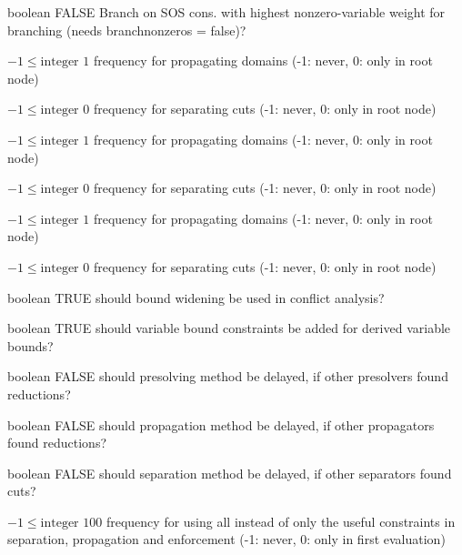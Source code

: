 %
{boolean}%
{FALSE}%
{Branch on SOS cons. with highest nonzero-variable weight for branching (needs branchnonzeros = false)?}%
{}

%
{$-1\leq\textrm{integer}$}%
{$1$}%
{frequency for propagating domains (-1: never, 0: only in root node)}%
{}

%
{$-1\leq\textrm{integer}$}%
{$0$}%
{frequency for separating cuts (-1: never, 0: only in root node)}%
{}

%
{$-1\leq\textrm{integer}$}%
{$1$}%
{frequency for propagating domains (-1: never, 0: only in root node)}%
{}

%
{$-1\leq\textrm{integer}$}%
{$0$}%
{frequency for separating cuts (-1: never, 0: only in root node)}%
{}

%
{$-1\leq\textrm{integer}$}%
{$1$}%
{frequency for propagating domains (-1: never, 0: only in root node)}%
{}

%
{$-1\leq\textrm{integer}$}%
{$0$}%
{frequency for separating cuts (-1: never, 0: only in root node)}%
{}

%
{boolean}%
{TRUE}%
{should bound widening be used in conflict analysis?}%
{}

%
{boolean}%
{TRUE}%
{should variable bound constraints be added for derived variable bounds?}%
{}

%
{boolean}%
{FALSE}%
{should presolving method be delayed, if other presolvers found reductions?}%
{}

%
{boolean}%
{FALSE}%
{should propagation method be delayed, if other propagators found reductions?}%
{}

%
{boolean}%
{FALSE}%
{should separation method be delayed, if other separators found cuts?}%
{}

%
{$-1\leq\textrm{integer}$}%
{$100$}%
{frequency for using all instead of only the useful constraints in separation, propagation and enforcement (-1: never, 0: only in first evaluation)}%
{}

